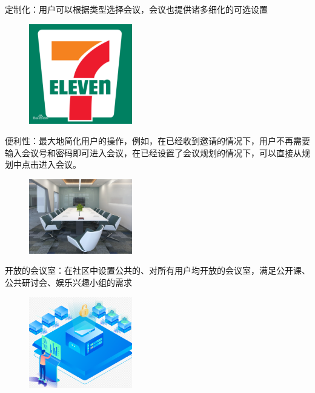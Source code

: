 \documentclass[a4paper,12pt]{article}
\begin{document}
    定制化：用户可以根据类型选择会议，会议也提供诸多细化的可选设置

    \begin{figure}[H]
        \centering
        \includegraphics[width=0.4\textwidth]{便利性.png}
    \end{figure}

    便利性：最大地简化用户的操作，例如，在已经收到邀请的情况下，用户不再需要输入会议号和密码即可进入会议，在已经设置了会议规划的情况下，可以直接从规划中点击进入会议。

    \begin{figure}[H]
        \centering
        \includegraphics[width=0.4\textwidth]{开放的会议室.png}
    \end{figure}

    开放的会议室：在社区中设置公共的、对所有用户均开放的会议室，满足公开课、公共研讨会、娱乐兴趣小组的需求

    \begin{figure}[H]
        \centering
        \includegraphics[width=0.4\textwidth]{教育企业平台.png}
    \end{figure}
\end{document}
